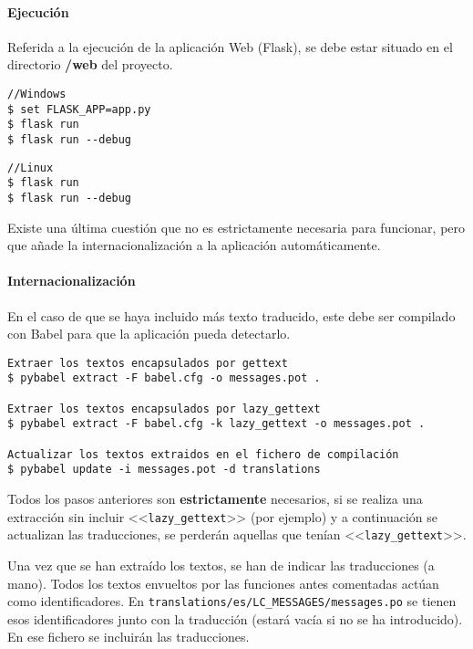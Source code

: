 \paragraph{Ejecución} Referida a la ejecución de la aplicación Web (Flask), se
debe estar situado en el directorio \textbf{/web} del proyecto.
\begin{tcolorbox}[colback=cyan!5!white,colframe=cyan!75!black,fontupper=\footnotesize,fontlower=\footnotesize,title=Ejecución]
\begin{verbatim}
//Windows
$ set FLASK_APP=app.py
$ flask run
$ flask run --debug
\end{verbatim}
\tcblower
\begin{verbatim}
//Linux
$ flask run
$ flask run --debug
\end{verbatim}
\end{tcolorbox}

Existe una última cuestión que no es estrictamente necesaria para funcionar,
pero que añade la internacionalización a la aplicación automáticamente.

\paragraph{Internacionalización} En el caso de que se haya incluido más texto
traducido, este debe ser compilado con Babel para que la aplicación pueda
detectarlo.

\begin{tcolorbox}[colback=cyan!5!white,colframe=cyan!75!black,fontupper=\footnotesize,title=Proceso de internacionalización (desde \texttt{/web/app})]
\begin{verbatim}
Extraer los textos encapsulados por gettext
$ pybabel extract -F babel.cfg -o messages.pot .

Extraer los textos encapsulados por lazy_gettext
$ pybabel extract -F babel.cfg -k lazy_gettext -o messages.pot .

Actualizar los textos extraidos en el fichero de compilación
$ pybabel update -i messages.pot -d translations
\end{verbatim}
\end{tcolorbox}

Todos los pasos anteriores son \textbf{estrictamente} necesarios, si se realiza
una extracción sin incluir <<\texttt{lazy\_gettext}>> (por ejemplo) y a
continuación se actualizan las traducciones, se perderán aquellas que tenían
<<\texttt{lazy\_gettext}>>.

Una vez que se han extraído los textos, se han de indicar las traducciones (a
mano). Todos los textos envueltos por las funciones antes comentadas actúan como
identificadores. En \texttt{translations/es/LC\_MESSAGES/messages.po} se tienen
esos identificadores junto con la traducción (estará vacía si no se ha
introducido). En ese fichero se incluirán las traducciones.

